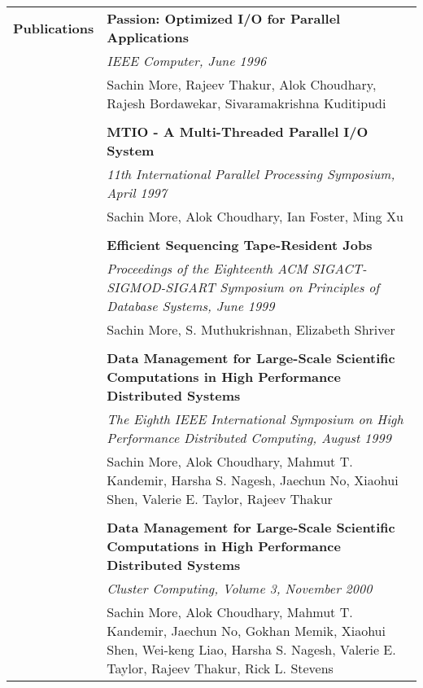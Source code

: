 \documentclass[10pt]{article}
\begin{document}
\begin{longtable}{p{ 90pt}p{299pt}r}
{\bf Publications}  & \multicolumn{2}{p{4.5in}}{\bf Passion: Optimized I/O for Parallel Applications} \\
                    & \multicolumn{2}{p{4.5in}}{\em IEEE Computer, June 1996}\\
                    & \multicolumn{2}{p{4.5in}}{Sachin More, Rajeev Thakur, Alok Choudhary, Rajesh Bordawekar, Sivaramakrishna Kuditipudi}\\
\\
                    & \multicolumn{2}{p{4.5in}}{\bf MTIO - A Multi-Threaded Parallel I/O System}\\
                    & \multicolumn{2}{p{4.5in}}{\em 11th International Parallel Processing Symposium, April 1997}\\
                    & \multicolumn{2}{p{4.5in}}{Sachin More, Alok Choudhary, Ian Foster, Ming Xu} \\
\\
                    & \multicolumn{2}{p{4.5in}}{\bf Efficient Sequencing Tape-Resident Jobs}\\
                    & \multicolumn{2}{p{4.5in}}{\em Proceedings of the Eighteenth ACM SIGACT-SIGMOD-SIGART Symposium on Principles of Database Systems, June 1999}\\
                    & \multicolumn{2}{p{4.5in}}{Sachin More, S. Muthukrishnan, Elizabeth Shriver}\\
\\
                    & \multicolumn{2}{p{4.5in}}{\bf Data Management for Large-Scale Scientific Computations in High Performance Distributed Systems}\\
                    & \multicolumn{2}{p{4.5in}}{\em The Eighth IEEE International Symposium on High Performance Distributed Computing, August 1999}\\
                    & \multicolumn{2}{p{4.5in}}{Sachin More, Alok Choudhary, Mahmut T. Kandemir, Harsha S. Nagesh, Jaechun No, Xiaohui Shen, Valerie E. Taylor, Rajeev Thakur}\\
\\
                    & \multicolumn{2}{p{4.5in}}{\bf Data Management for Large-Scale Scientific Computations in High Performance Distributed Systems}\\
                    & \multicolumn{2}{p{4.5in}}{\em Cluster Computing, Volume 3, November 2000}\\
                    & \multicolumn{2}{p{4.5in}}{Sachin More, Alok Choudhary, Mahmut T. Kandemir, Jaechun No, Gokhan Memik, Xiaohui Shen,
						 Wei-keng Liao, Harsha S. Nagesh, Valerie E. Taylor, Rajeev Thakur, Rick L. Stevens} \\

\end{longtable}
\end{document}
